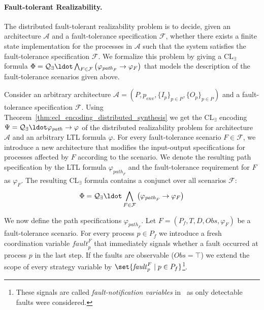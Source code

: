 \documentclass{LMCS}
\newcommand{\btrue}{\top}
\theoremstyle{plain}\newtheorem{theorem}[thm]{Theorem}
\theoremstyle{plain}\newtheorem{lemma}[thm]{Lemma}
\theoremstyle{plain}\newtheorem{proposition}[thm]{Proposition}
\theoremstyle{plain}\newtheorem{corollary}[thm]{Corollary}
\theoremstyle{definition}\newtheorem{definition}{Definition}[section]
\begin{document}
\paragraph{\bf Fault-tolerant Realizability.}
The distributed fault-tolerant realizability problem is to decide, given an architecture $\mathcal{A}$ and a fault-tolerance specification $\mathcal{F}$, whether there exists a finite state implementation for the processes in $\mathcal{A}$ such that the system satisfies the fault-tolerance specification $\mathcal{F}$.
We formalize this problem by giving a CL$_\exists$ formula $\Phi = \mathcal{Q}_\exists \ldot \bigwedge_{F \in \mathcal{F}} \big( \varphi_{\mathit{path}_F} \rightarrow \varphi_F \big)$ that models the description of the fault-tolerance scenarios given above.

Consider an arbitrary architecture $\mathcal{A} = (P,p_\mathit{env},\{I_p\}_{p \in P}, \{O_p\}_{p \in P})$ and a fault-tolerance specification $\mathcal{F}$.
Using Theorem~\ref{thm:ecl_encoding_distributed_synthesis} we get the CL$_\exists$ encoding $\Psi = \mathcal{Q}_\exists \ldot \varphi_\mathit{path} \rightarrow \varphi$ of the distributed realizability problem for architecture $\mathcal{A}$ and an arbitrary LTL formula $\varphi$.
For every fault-tolerance scenario $F \in \mathcal{F}$, we introduce a new architecture that modifies the input-output specifications for processes affected by $F$ according to the scenario.
We denote the resulting path specification by the LTL formula $\varphi_{\mathit{path}_F}$ and the fault-tolerance requirement for $F$ as $\varphi_F$.
The resulting CL$_\exists$ formula contains a conjunct over all scenarios $\mathcal{F}$:
\begin{equation*}
  \Phi = \mathcal{Q}_\exists \ldot \bigwedge_{F \in \mathcal{F}} \big( \varphi_{\mathit{path}_F} \rightarrow \varphi_F \big)
\end{equation*}

We now define the path specifications $\varphi_{\mathit{path}_F}$.
Let $F = (P_f,T,D,\mathit{Obs},\varphi_F)$ be a fault-tolerance scenario.
For every process $p \in P_f$ we introduce a fresh coordination variable $\mathit{fault}^F_p$ that immediately signals whether a fault occurred at process $p$ in the last step.
If the faults are observable ($\mathit{Obs} = \btrue$) we extend the scope of every strategy variable by $\set{\mathit{fault}^F_p \mid p \in P_f}$\footnote{These signals are called \emph{fault-notification variables} in~\cite{DBLP:conf/atva/DimitrovaF09} as only detectable faults were considered.}.
\end{document}
